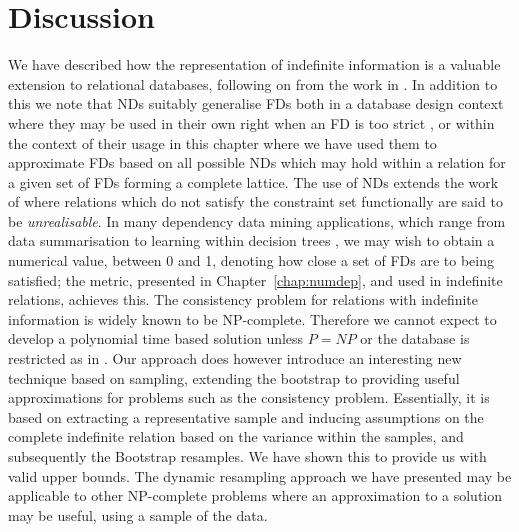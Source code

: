 \section{Discussion}\label{sec:cp_disc}


We have described how the representation of indefinite information is a 
valuable extension to relational databases, following on from the work
in \cite{inv91,vn95}. In addition to this we 
note that NDs suitably generalise FDs
both in a database design context where they may be used in their
own right when an FD is too strict \cite{gm85b}, or within the context of their
usage in this chapter where we have used them to approximate FDs based
on all possible NDs which may hold within a relation for a given set
of FDs forming a complete lattice.  The use of NDs extends the work of
\cite{vn95} 
where relations which do not satisfy the constraint set functionally are
said to be {\em unrealisable}. In many dependency data mining applications,
which range from data summarisation to learning within decision trees \cite{psm93}, we may wish to obtain a numerical value, between 0 and 1, denoting how close a set of 
FDs are to being satisfied; the metric, presented in
Chapter~\ref{chap:numdep}, and used in indefinite relations, achieves
this. 
The consistency problem for relations with indefinite information is
widely known to be NP-complete. Therefore we cannot expect to
develop a polynomial time based solution unless $P = NP$ or the database is
restricted as in \cite{vn95}. Our approach
does however introduce an interesting new technique based on sampling,
extending the bootstrap to providing useful approximations for
problems such as the consistency problem. Essentially, it is based on
extracting a representative sample and inducing assumptions on the 
complete indefinite relation based on the variance within the samples, and
subsequently the Bootstrap resamples. We have shown this to provide us
with valid upper bounds. The dynamic resampling approach we have
presented may be applicable to other NP-complete problems where an
approximation to a solution may be useful, using a sample of the data.

\medskip

